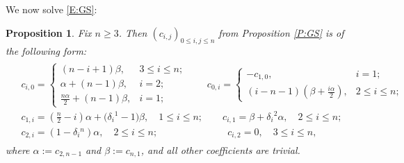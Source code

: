 \documentclass[10pt,a4paper]{amsart}
\numberwithin{equation}{section}
\newtheorem{Proposition}[Theorem]{Proposition}
 { \theoremstyle{definition}
\newtheorem{Definition}[Theorem]{Definition}
\newtheorem{Note}[Theorem]{Note}
\newtheorem{Example}[Theorem]{Example}
\newtheorem{Remark}[Theorem]{Remark} }
\begin{document}
We now solve \eqref{E:GS}:
\begin{Proposition}\label{P:sol}
Fix $n \ge 3$. Then $(c_{i,j})_{0 \leq i,j \leq n}$ from Proposition {\rm \ref{P:GS}} is of the following form:
\begin{align} \label{E:sol}
\begin{split}
&c_{i,0}=\begin{cases}
(n-i+1)\beta, & 3 \le i \le n;\\
\alpha + (n-1)\beta, & i = 2;\\
\frac{n \alpha}{2} + (n-1)\beta, & i = 1;
\end{cases} \qquad
c_{0,i}=\begin{cases}
-c_{1,0}, & i =1; \\
(i-n-1)(\beta + \frac{i\alpha}{2}), & 2 \le i \le n;
\end{cases}\\
&c_{1,i}= \left(\frac{n}{2}-i\right)\alpha + \bigl(\delta_i{}^1-1\bigr)\beta, \quad 1 \le i \le n; \qquad c_{i,1} = \beta + \delta_i{}^2 \alpha, \quad 2 \le i \le n;\\
&c_{2,i} = (1-\delta_i{}^n)\alpha, \quad 2 \le i \le n; \hspace{3cm} c_{i,2}= 0, \quad 3 \le i \le n,
\end{split}
\end{align}
where $\alpha :=c_{2,n-1}$ and $\beta := c_{n,1}$, and all other coefficients are trivial.
\end{Proposition}
\end{document}
